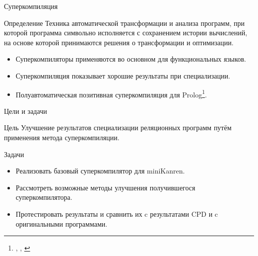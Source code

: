 \documentclass[xcolor=table]{beamer}
\newcommand{\citepres}[1]{{\it \citetitle{#1}}, \citeauthor{#1}, \citeyear{#1}}
\begin{document}
\begin{frame}{Суперкомпиляция}

\begin{block}{Определение}
Техника автоматической трансформации и анализа программ, при которой
программа символьно исполняется с сохранением истории вычислений, на основе
которой принимаются решения о трансформации и оптимизации.
\end{block}

\begin{itemize}
\item Суперкомпиляторы применяются во основном для функциональных языков.
\item Суперкомпиляция показывает хорошие результаты при специализации.
\item Полуавтоматическая позитивная суперкомпиляция для Prolog\footnote{\citepres{apropos}}.
\end{itemize}

\end{frame}
%
%
\begin{frame}{Цели и задачи}
\begin{block}{Цель}
Улучшение результатов специализации реляционных программ путём применения метода суперкомпиляции.
\end{block}
%
%
\begin{block}{Задачи}
\begin{itemize}
\item Реализовать базовый суперкомпилятор для miniKanren.
\item Рассмотреть возможные методы улучшения получившегося суперкомпилятора.
\item Протестировать результаты и сравнить их c результатами CPD и c оригинальными программами.
\end{itemize}
\end{block}
\end{frame}
\end{document}
